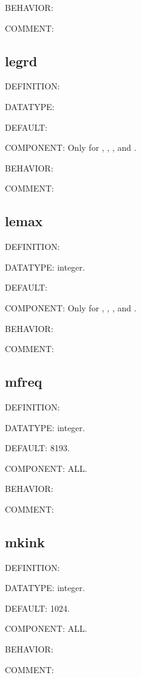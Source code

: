 {\color{purple}BEHAVIOR:}

{\color{olive}COMMENT:}

\subsection{legrd}
{\color{red}DEFINITION:}

{\color{green}DATATYPE:}

{\color{blue}DEFAULT:}

{\color{brown}COMPONENT:} Only for {\gardenia}, {\narcissus}, {\lavender}, and {\manjushaka}.

{\color{purple}BEHAVIOR:}

{\color{olive}COMMENT:}

\subsection{lemax}
{\color{red}DEFINITION:}

{\color{green}DATATYPE:} integer.

{\color{blue}DEFAULT:}

{\color{brown}COMPONENT:} Only for {\gardenia}, {\narcissus}, {\lavender}, and {\manjushaka}.

{\color{purple}BEHAVIOR:}

{\color{olive}COMMENT:}

\subsection{mfreq}
{\color{red}DEFINITION:}

{\color{green}DATATYPE:} integer.

{\color{blue}DEFAULT:} 8193.

{\color{brown}COMPONENT:} ALL.

{\color{purple}BEHAVIOR:}

{\color{olive}COMMENT:}

\subsection{mkink}
{\color{red}DEFINITION:}

{\color{green}DATATYPE:} integer.

{\color{blue}DEFAULT:} 1024.

{\color{brown}COMPONENT:} ALL.

{\color{purple}BEHAVIOR:}

{\color{olive}COMMENT:}

